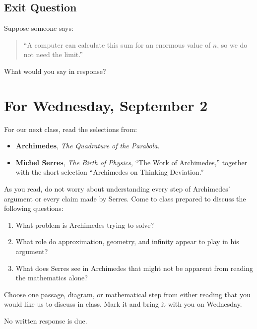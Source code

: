 \documentclass[11pt]{article}
\begin{document}
\subsection*{Exit Question}

Suppose someone says:

\begin{quote}
``A computer can calculate this sum for an enormous value of \(n\),
so we do not need the limit.''
\end{quote}

What would you say in response?

\vspace{0.8in}

\clearpage



\section*{For Wednesday, September 2}


For our next class, read the selections from:

\begin{itemize}[leftmargin=*]

    \item \textbf{Archimedes}, \emph{The Quadrature of the Parabola}.

    \item \textbf{Michel Serres}, \emph{The Birth of Physics},
    ``The Work of Archimedes,'' together with the short selection
    ``Archimedes on Thinking Deviation.''

\end{itemize}

As you read, do not worry about understanding every step of
Archimedes' argument or every claim made by Serres. Come to class
prepared to discuss the following questions:

\begin{enumerate}[leftmargin=*]

    \item What problem is Archimedes trying to solve?

    \item What role do approximation, geometry, and infinity appear
    to play in his argument?

    \item What does Serres see in Archimedes that might not be
    apparent from reading the mathematics alone?

\end{enumerate}

\begin{reflection}
Choose one passage, diagram, or mathematical step from either reading
that you would like us to discuss in class. Mark it and bring it with
you on Wednesday.

No written response is due.
\end{reflection}
\end{document}
